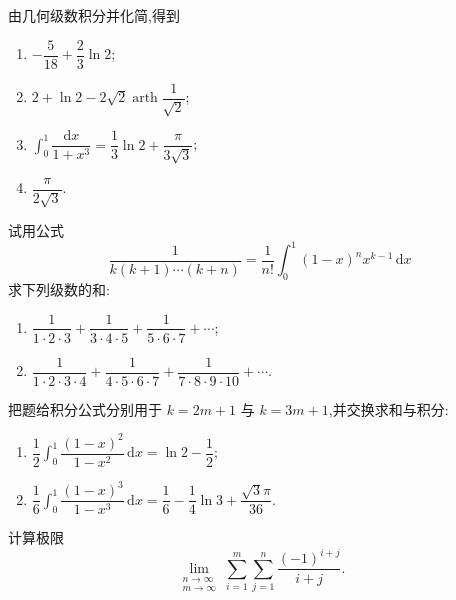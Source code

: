 \begin{solution}
    由几何级数积分并化简,得到
    \begin{enumerate}
        \item $\displaystyle -\dfrac{5}{18}+\dfrac{2}{3}\ln2$;
        \item $\displaystyle 2+\ln2-2\sqrt2\operatorname{arth}\dfrac{1}{\sqrt2}$;
        \item $\displaystyle \int_0^1\dfrac{\mathrm{d}x}{1+x^3}
                  =\dfrac{1}{3}\ln2+\dfrac{\pi}{3\sqrt3}$;
        \item $\displaystyle\dfrac{\pi}{2\sqrt3}$.
    \end{enumerate}
\end{solution}

\begin{example}
    试用公式
    \[
        \dfrac{1}{k(k+1)\cdots(k+n)}
        =\dfrac{1}{n!}\int_0^1(1-x)^nx^{k-1}\,\mathrm{d}x
    \]
    求下列级数的和:
    \begin{enumerate}
        \item $\displaystyle\dfrac{1}{1\cdot2\cdot3}+\dfrac{1}{3\cdot4\cdot5}+\dfrac{1}{5\cdot6\cdot7}+\cdots$;
        \item $\displaystyle\dfrac{1}{1\cdot2\cdot3\cdot4}+\dfrac{1}{4\cdot5\cdot6\cdot7}+\dfrac{1}{7\cdot8\cdot9\cdot10}+\cdots$.
    \end{enumerate}
\end{example}
\exampleblank

\begin{solution}
    把题给积分公式分别用于 $k=2m+1$ 与 $k=3m+1$,并交换求和与积分:
    \begin{enumerate}
        \item $\displaystyle\dfrac{1}{2}\int_0^1\dfrac{(1-x)^2}{1-x^2}\,\mathrm{d}x
                  =\ln2-\dfrac{1}{2}$;
        \item $\displaystyle\dfrac{1}{6}\int_0^1\dfrac{(1-x)^3}{1-x^3}\,\mathrm{d}x
                  =\dfrac{1}{6}-\dfrac{1}{4}\ln3+\dfrac{\sqrt3\pi}{36}$.
    \end{enumerate}
\end{solution}

\begin{example}
    计算极限
    \[
        \displaystyle\lim\limits_{\substack{n\to\infty\\m\to\infty}}
        \sum\limits_{i=1}^{m}\sum\limits_{j=1}^{n}\dfrac{(-1)^{i+j}}{i+j}.
    \]
\end{example}
\exampleblank

